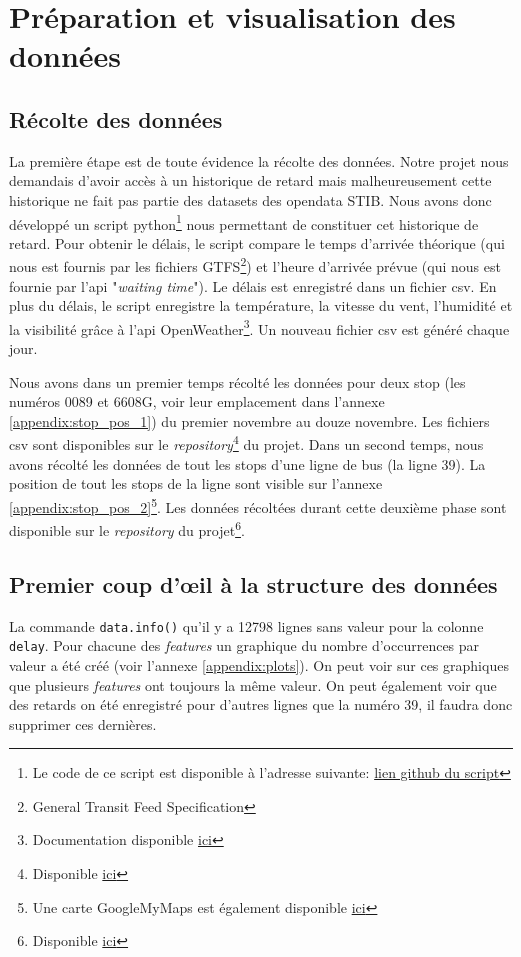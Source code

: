 \chapter{Préparation et visualisation des données}

\section{Récolte des données}
La première étape est de toute évidence la récolte des données. Notre projet nous demandais d'avoir accès à un historique de retard mais malheureusement cette historique ne fait pas partie des datasets des opendata STIB. Nous avons donc développé un script python\footnote{Le code de ce script est disponible à l'adresse suivante: \href{https://github.com/jalbrecq/CanYouCatchIt/blob/main/sandbox/delay_gathering/delay_gathering.py}{lien github du script}} nous permettant de constituer cet historique de retard. Pour obtenir le délais, le script compare le temps d'arrivée théorique (qui nous est fournis par les fichiers GTFS\footnote{General Transit Feed Specification}) et l'heure d'arrivée prévue (qui nous est fournie par l'api "\textit{waiting time}"). Le délais est enregistré dans un fichier csv. En plus du délais, le script enregistre la température, la vitesse du vent, l'humidité et la visibilité grâce à l'api OpenWeather\footnote{Documentation disponible \href{https://openweathermap.org/}{ici}}. Un nouveau fichier csv est généré chaque jour.

Nous avons dans un premier temps récolté les données pour deux stop (les numéros 0089 et 6608G, voir leur emplacement dans l'annexe \ref{appendix:stop_pos_1}) du premier novembre au douze novembre. Les fichiers csv sont disponibles sur le \textit{repository}\footnote{Disponible \href{https://github.com/jalbrecq/CanYouCatchIt/tree/main/sandbox/data/csv}{ici}} du projet. Dans un second temps, nous avons récolté les données de tout les stops d'une ligne de bus (la ligne 39). La position de tout les stops de la ligne sont visible sur l'annexe \ref{appendix:stop_pos_2}\footnote{Une carte GoogleMyMaps est également disponible \href{https://www.google.com/maps/d/edit?mid=1_qNGPUfuZXrqC3UZXkmDOWuhEHJfYAox&usp=sharing}{ici}}. Les données récoltées durant cette deuxième phase sont disponible sur le \textit{repository} du projet\footnote{Disponible \href{https://github.com/jalbrecq/CanYouCatchIt/tree/main/sandbox/data/csv2}{ici}}.

\section{Premier coup d'œil à la structure des données}
La commande \lstinline!data.info()! qu'il y a 12798 lignes sans valeur pour la colonne \lstinline!delay!. Pour chacune des \textit{features} un graphique du nombre d'occurrences par valeur a été créé (voir l'annexe \ref{appendix:plots}). On peut voir sur ces graphiques que plusieurs \textit{features} ont toujours la même valeur. On peut également voir que des retards on été enregistré pour d'autres lignes que la numéro 39, il faudra donc supprimer ces dernières.


